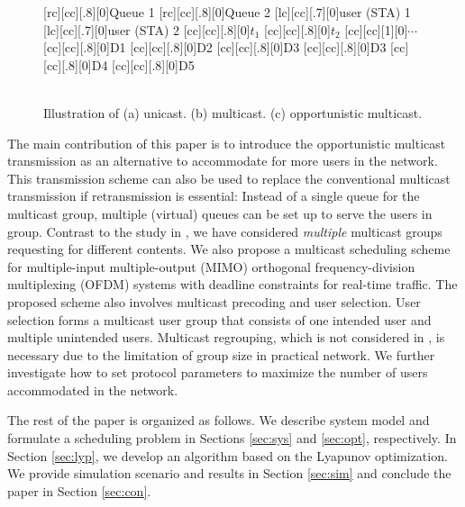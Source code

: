\documentclass[conference]{IEEEtran}
\newcommand{\0}{\vect{0}}
\newcommand{\1}{\vect{1}}
\begin{document}
\begin{figure}[!t]
\begin{center}
[rc][cc][.8][0]{\sf Queue 1}
[rc][cc][.8][0]{\sf Queue 2}
[lc][cc][.7][0]{\sf user (STA) 1}
[lc][cc][.7][0]{\sf user (STA) 2}
[cc][cc][.8][0]{\sf $t_1$}
[cc][cc][.8][0]{\sf $t_2$}
[cc][cc][1][0]{\sf $\cdots$}
[cc][cc][.8][0]{\sf D1}
[cc][cc][.8][0]{\sf D2}
[cc][cc][.8][0]{\sf D3}
[cc][cc][.8][0]{\sf D3}
[cc][cc][.8][0]{\sf D4}
[cc][cc][.8][0]{\sf D5}
\\
\\
\caption{Illustration of (a) unicast. (b) multicast. (c) opportunistic multicast.}
\label{fig:f0}
\end{center}
\end{figure}





The main contribution of this paper is to introduce the opportunistic multicast transmission as an alternative to accommodate for more users in the network. This transmission scheme can also be used to replace the conventional multicast transmission if retransmission is essential: Instead of a single queue for the multicast group, multiple (virtual) queues can be set up to serve the users in group. Contrast to the study in \cite{Won09WC,Low10WC,Tsa11WC}, we have considered {\it multiple} multicast groups requesting for different contents. We also propose a multicast scheduling scheme for multiple-input multiple-output (MIMO) orthogonal frequency-division multiplexing (OFDM) systems with deadline constraints for real-time traffic. The proposed scheme also involves multicast precoding and user selection. User selection forms a multicast user group that consists of one intended user and multiple unintended users. Multicast regrouping, which is not considered in \cite{Won09WC}, is necessary due to the limitation of group size in practical network. We further investigate how to set protocol parameters to maximize the number of users accommodated in the network.


The rest of the paper is organized as follows. We describe system model and formulate a scheduling problem in Sections \ref{sec:sys} and \ref{sec:opt}, respectively. In Section \ref{sec:lyp}, we develop an algorithm based on the Lyapunov optimization. We provide simulation scenario and results in Section \ref{sec:sim} and conclude the paper in Section \ref{sec:con}.
\end{document}
